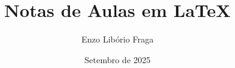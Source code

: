 % 


\title{Notas de Aulas em \LaTeX}
\author{Enzo Libório Fraga}
\date{Setembro de 2025}

\maketitle